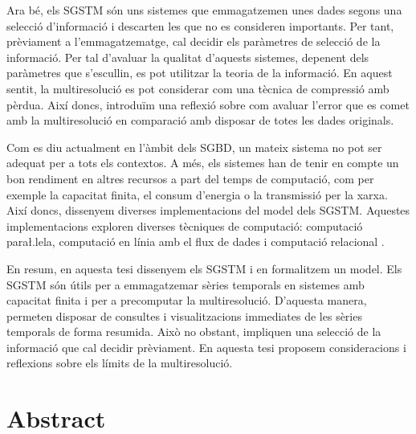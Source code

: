 Ara bé, els \gls{SGSTM} són uns sistemes que emmagatzemen unes dades
segons una selecció d'informació i descarten les que no es consideren
importants. Per tant, prèviament a l'emmagatzematge, cal decidir els
paràmetres de selecció de la informació. Per tal d'avaluar la qualitat
d'aquests sistemes, depenent dels paràmetres que s'escullin, es pot
utilitzar la teoria de la informació. En aquest sentit, la
multiresolució es pot considerar com una tècnica de compressió amb
pèrdua. Així doncs, introduïm una reflexió sobre com avaluar l'error
que es comet amb la multiresolució en comparació amb disposar de totes
les dades originals.


Com es diu actualment en l'àmbit dels \gls{SGBD}, un mateix sistema no
pot ser adequat per a tots els contextos. A més, els sistemes han de
tenir en compte un bon rendiment en altres recursos a part del temps
de computació, com per exemple la capacitat finita, el consum
d'energia o la transmissió per la xarxa. Així doncs, dissenyem
diverses implementacions del model dels \gls{SGSTM}. Aquestes
implementacions exploren diverses tècniques de computació: computació
para\l.lela, computació en línia amb el flux de dades i computació relacional .


En resum, en aquesta tesi dissenyem els \gls{SGSTM} i en formalitzem
un model.  Els \gls{SGSTM} són útils per a emmagatzemar sèries
temporals en sistemes amb capacitat finita i per a precomputar la
multiresolució. D'aquesta manera, permeten disposar de consultes i
visualitzacions immediates de les sèries temporals de forma
resumida. Això no obstant, impliquen una selecció de la informació que
cal decidir prèviament. En aquesta tesi proposem consideracions i
reflexions sobre els límits de la multiresolució.





\chapter*{Abstract}









